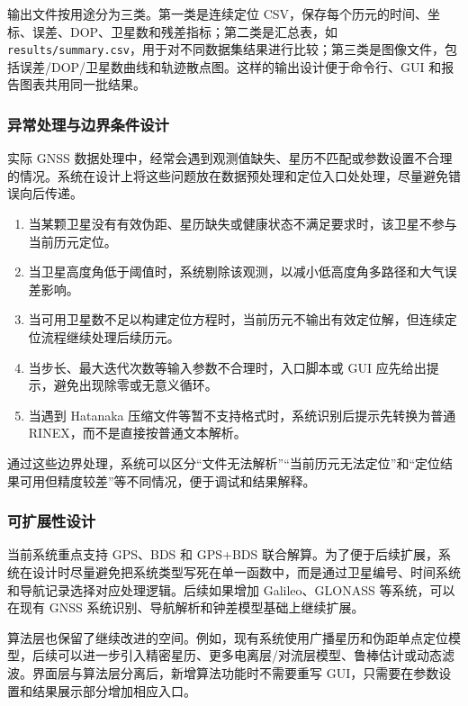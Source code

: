 输出文件按用途分为三类。第一类是连续定位 CSV，保存每个历元的时间、坐标、误差、DOP、卫星数和残差指标；第二类是汇总表，如 \texttt{results/summary.csv}，用于对不同数据集结果进行比较；第三类是图像文件，包括误差/DOP/卫星数曲线和轨迹散点图。这样的输出设计便于命令行、GUI 和报告图表共用同一批结果。

\subsubsection{异常处理与边界条件设计}

实际 GNSS 数据处理中，经常会遇到观测值缺失、星历不匹配或参数设置不合理的情况。系统在设计上将这些问题放在数据预处理和定位入口处处理，尽量避免错误向后传递。

\begin{enumerate}
\item 当某颗卫星没有有效伪距、星历缺失或健康状态不满足要求时，该卫星不参与当前历元定位。
\item 当卫星高度角低于阈值时，系统剔除该观测，以减小低高度角多路径和大气误差影响。
\item 当可用卫星数不足以构建定位方程时，当前历元不输出有效定位解，但连续定位流程继续处理后续历元。
\item 当步长、最大迭代次数等输入参数不合理时，入口脚本或 GUI 应先给出提示，避免出现除零或无意义循环。
\item 当遇到 Hatanaka 压缩文件等暂不支持格式时，系统识别后提示先转换为普通 RINEX，而不是直接按普通文本解析。
\end{enumerate}

通过这些边界处理，系统可以区分“文件无法解析”“当前历元无法定位”和“定位结果可用但精度较差”等不同情况，便于调试和结果解释。

\subsubsection{可扩展性设计}

当前系统重点支持 GPS、BDS 和 GPS+BDS 联合解算。为了便于后续扩展，系统在设计时尽量避免把系统类型写死在单一函数中，而是通过卫星编号、时间系统和导航记录选择对应处理逻辑。后续如果增加 Galileo、GLONASS 等系统，可以在现有 GNSS 系统识别、导航解析和钟差模型基础上继续扩展。

算法层也保留了继续改进的空间。例如，现有系统使用广播星历和伪距单点定位模型，后续可以进一步引入精密星历、更多电离层/对流层模型、鲁棒估计或动态滤波。界面层与算法层分离后，新增算法功能时不需要重写 GUI，只需要在参数设置和结果展示部分增加相应入口。
